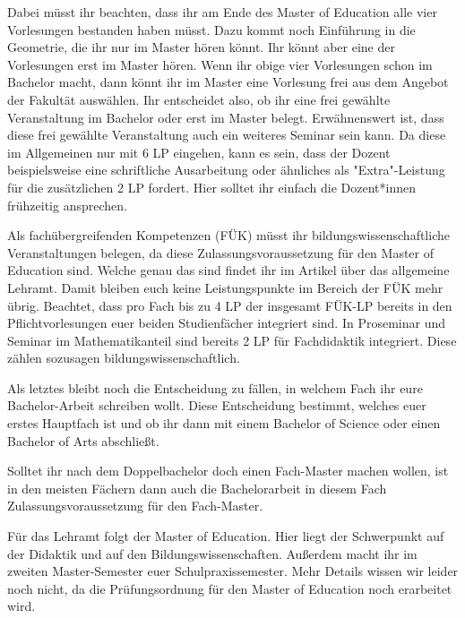 Dabei müsst ihr beachten, dass ihr am Ende des Master of Education alle vier
Vorlesungen bestanden haben müsst. Dazu kommt noch Einführung in die Geometrie,
die ihr nur im Master hören könnt. Ihr könnt aber eine der Vorlesungen erst im
Master hören. Wenn ihr obige vier Vorlesungen schon im Bachelor macht, dann
könnt ihr im Master eine Vorlesung frei aus dem Angebot der Fakultät auswählen.
Ihr entscheidet also, ob ihr eine frei gewählte Veranstaltung im Bachelor oder
erst im Master belegt.  Erwähnenswert ist, dass diese frei gewählte
Veranstaltung auch ein weiteres Seminar sein kann. Da diese im Allgemeinen nur
mit 6 LP eingehen, kann es sein, dass der Dozent beispielsweise eine
schriftliche Ausarbeitung oder ähnliches als "Extra"-Leistung für die
zusätzlichen 2 LP fordert. Hier solltet ihr einfach die Dozent*innen frühzeitig
ansprechen.

Als fachübergreifenden Kompetenzen (FÜK) müsst ihr bildungswissenschaftliche
Veranstaltungen belegen, da diese Zulassungsvoraussetzung für den Master of
Education sind. Welche genau das sind findet ihr im Artikel über das allgemeine
Lehramt. Damit bleiben euch keine Leistungspunkte im Bereich der FÜK mehr übrig.
Beachtet, dass pro Fach bis zu 4 LP der insgesamt FÜK-LP bereits in den
Pflichtvorlesungen euer beiden Studienfächer integriert sind. In Proseminar und
Seminar im Mathematikanteil sind bereits 2 LP für Fachdidaktik integriert.
Diese zählen sozusagen bildungswissenschaftlich.

Als letztes bleibt noch die Entscheidung zu fällen, in welchem Fach ihr eure
Bachelor-Arbeit schreiben wollt. Diese Entscheidung bestimmt, welches euer
erstes Hauptfach ist und ob ihr dann mit einem Bachelor of Science oder einen
Bachelor of Arts abschließt.

Solltet ihr nach dem Doppelbachelor doch einen Fach-Master machen wollen, ist in
den meisten Fächern dann auch die Bachelorarbeit in diesem Fach
Zulassungsvoraussetzung für den Fach-Master.

Für das Lehramt folgt der Master of Education. Hier liegt der Schwerpunkt auf
der Didaktik und auf den Bildungswissenschaften. Außerdem macht ihr im zweiten
Master-Semester euer Schulpraxissemester. Mehr Details wissen wir leider noch
nicht, da die Prüfungsordnung für den Master of Education noch erarbeitet wird.
